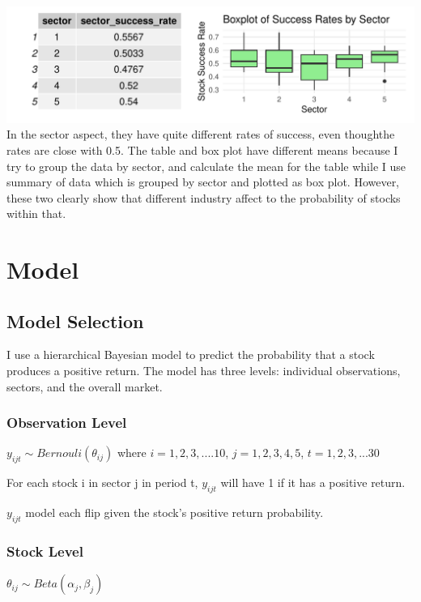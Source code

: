 \documentclass[
  11pt,
]{article}
\begin{document}
\includegraphics{Final-Project_files/figure-latex/unnamed-chunk-3-1.pdf}
In the sector aspect, they have quite different rates of success, even
thoughthe rates are close with 0.5. The table and box plot have
different means because I try to group the data by sector, and calculate
the mean for the table while I use summary of data which is grouped by
sector and plotted as box plot. However, these two clearly show that
different industry affect to the probability of stocks within that.

\section{Model}\label{model}

\subsection{Model Selection}\label{model-selection}

I use a hierarchical Bayesian model to predict the probability that a
stock produces a positive return. The model has three levels: individual
observations, sectors, and the overall market.

\subsubsection{Observation Level}\label{observation-level}

\(y_{ijt} \sim Bernouli(\theta_{ij})\) where \(i = {1, 2, 3, .... 10}\),
\(j = {1, 2, 3, 4, 5}\), \(t = {1, 2, 3, ... 30}\)

For each stock i in sector j in period t, \(y_{ijt}\) will have 1 if it
has a positive return.

\(y_{ijt}\) model each flip given the stock's positive return
probability.

\subsubsection{Stock Level}\label{stock-level}

\(\theta_{ij} \sim Beta(\alpha_j, \beta_j)\)
\end{document}
